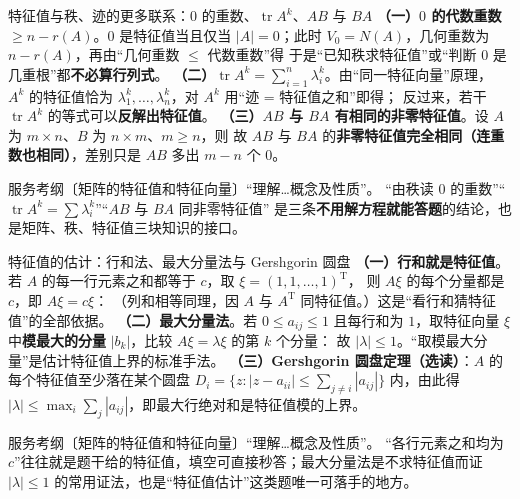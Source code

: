 
\begin{fdeep}{特征值与秩、迹的更多联系：$0$ 的重数、$\operatorname{tr}A^{k}$、$AB$ 与 $BA$}
\textbf{（一）$0$ 的代数重数 $\ge n-r(A)$}。$0$ 是特征值当且仅当 $\lvert A\rvert=0$；此时
$V_0=N(A)$，几何重数为 $n-r(A)$，再由“几何重数 $\le$ 代数重数”得
于是“已知秩求特征值”或“判断 $0$ 是几重根”都\textbf{不必算行列式}。
\textbf{（二）$\operatorname{tr}A^{k}=\sum_{i=1}^{n}\lambda_i^{k}$}。由“同一特征向量”原理，
$A^{k}$ 的特征值恰为 $\lambda_1^{k},\dots,\lambda_n^{k}$，对 $A^{k}$ 用“迹 = 特征值之和”即得；
反过来，若干 $\operatorname{tr}A^{k}$ 的等式可以\textbf{反解出特征值}。
\textbf{（三）$AB$ 与 $BA$ 有相同的非零特征值}。设 $A$ 为 $m\times n$、$B$ 为 $n\times m$、$m\ge n$，则
故 $AB$ 与 $BA$ 的\textbf{非零特征值完全相同（连重数也相同）}，差别只是 $AB$ 多出 $m-n$ 个 $0$。

\fbref{}服务考纲〔矩阵的特征值和特征向量〕“理解…概念及性质”。
“由秩读 $0$ 的重数”“$\operatorname{tr}A^{k}=\sum\lambda_i^{k}$”“$AB$ 与 $BA$ 同非零特征值”
是三条\textbf{不用解方程就能答题}的结论，也是矩阵、秩、特征值三块知识的接口。
\end{fdeep}

\begin{fdeep}{特征值的估计：行和法、最大分量法与 Gershgorin 圆盘}
\textbf{（一）行和就是特征值}。若 $A$ 的每一行元素之和都等于 $c$，取 $\xi=(1,1,\dots,1)^{\mathrm T}$，
则 $A\xi$ 的每个分量都是 $c$，即 $A\xi=c\xi$：
（列和相等同理，因 $A$ 与 $A^{\mathrm T}$ 同特征值。）这是“看行和猜特征值”的全部依据。
\textbf{（二）最大分量法}。若 $0\le a_{ij}\le1$ 且每行和为 $1$，取特征向量 $\xi$ 中\textbf{模最大的分量}
$|b_k|$，比较 $A\xi=\lambda\xi$ 的第 $k$ 个分量：
故 $|\lambda|\le1$。“取模最大分量”是估计特征值上界的标准手法。
\textbf{（三）Gershgorin 圆盘定理（选读）}：$A$ 的每个特征值至少落在某个圆盘
$D_i=\{z:|z-a_{ii}|\le\sum_{j\ne i}|a_{ij}|\}$ 内，由此得
$\lvert\lambda\rvert\le\max_i\sum_j|a_{ij}|$，即最大行绝对和是特征值模的上界。

\fbref{}服务考纲〔矩阵的特征值和特征向量〕“理解…概念及性质”。
“各行元素之和均为 $c$”往往就是题干给的特征值，填空可直接秒答；最大分量法是不求特征值而证
$|\lambda|\le1$ 的常用证法，也是“特征值估计”这类题唯一可落手的地方。
\end{fdeep}

